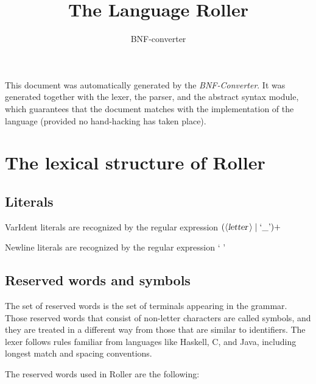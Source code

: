 \documentclass[a4paper,11pt]{article}
\author{BNF-converter}
\title{The Language Roller}
\begin{document}
\maketitle

\newcommand{\emptyP}{\mbox{$\epsilon$}}
\newcommand{\terminal}[1]{\mbox{{\texttt {#1}}}}
\newcommand{\nonterminal}[1]{\mbox{$\langle \mbox{{\sl #1 }} \! \rangle$}}
\newcommand{\arrow}{\mbox{::=}}
\newcommand{\delimit}{\mbox{$|$}}
\newcommand{\reserved}[1]{\mbox{{\texttt {#1}}}}
\newcommand{\literal}[1]{\mbox{{\texttt {#1}}}}
\newcommand{\symb}[1]{\mbox{{\texttt {#1}}}}

This document was automatically generated by the {\em BNF-Converter}. It was generated together with the lexer, the parser, and the abstract syntax module, which guarantees that the document matches with the implementation of the language (provided no hand-hacking has taken place).

\section*{The lexical structure of Roller}

\subsection*{Literals}






VarIdent literals are recognized by the regular expression
\(({\nonterminal{letter}} \mid \mbox{`\_'})+\)

Newline literals are recognized by the regular expression
\(\mbox{`
'}\)


\subsection*{Reserved words and symbols}
The set of reserved words is the set of terminals appearing in the grammar. Those reserved words that consist of non-letter characters are called symbols, and they are treated in a different way from those that are similar to identifiers. The lexer follows rules familiar from languages like Haskell, C, and Java, including longest match and spacing conventions.

The reserved words used in Roller are the following: \\
\end{document}
